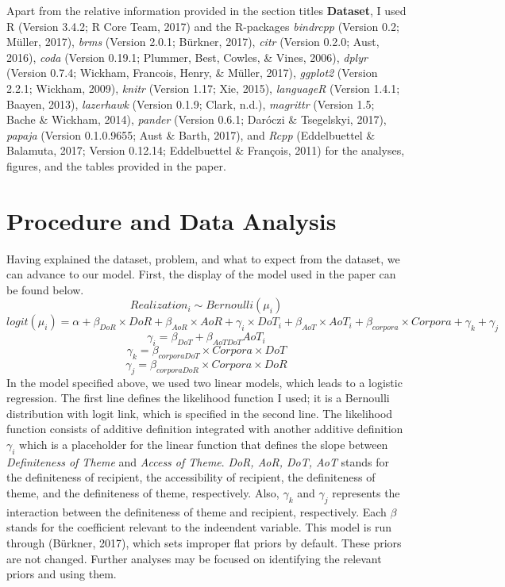 \documentclass[english,floatsintext,man]{apa6}
\theoremstyle{definition}
\theoremstyle{definition}
\theoremstyle{definition}
\theoremstyle{remark}
\begin{document}
Apart from the relative information provided in the section titles
\textbf{Dataset}, I used R (Version 3.4.2; R Core Team, 2017) and the
R-packages \emph{bindrcpp} (Version 0.2; Müller, 2017), \emph{brms}
(Version 2.0.1; Bürkner, 2017), \emph{citr} (Version 0.2.0; Aust, 2016),
\emph{coda} (Version 0.19.1; Plummer, Best, Cowles, \& Vines, 2006),
\emph{dplyr} (Version 0.7.4; Wickham, Francois, Henry, \& Müller, 2017),
\emph{ggplot2} (Version 2.2.1; Wickham, 2009), \emph{knitr} (Version
1.17; Xie, 2015), \emph{languageR} (Version 1.4.1; Baayen, 2013),
\emph{lazerhawk} (Version 0.1.9; Clark, n.d.), \emph{magrittr} (Version
1.5; Bache \& Wickham, 2014), \emph{pander} (Version 0.6.1; Daróczi \&
Tsegelskyi, 2017), \emph{papaja} (Version 0.1.0.9655; Aust \& Barth,
2017), and \emph{Rcpp} (Eddelbuettel \& Balamuta, 2017; Version 0.12.14;
Eddelbuettel \& François, 2011) for the analyses, figures, and the
tables provided in the paper.

\section{Procedure and Data Analysis}\label{procedure-and-data-analysis}

Having explained the dataset, problem, and what to expect from the
dataset, we can advance to our model. First, the display of the model
used in the paper can be found below.
\[Realization_i \sim Bernoulli(\mu_i)\]
\[logit(\mu_i) = \alpha+\beta_{DoR}\times{DoR}+\beta_{AoR}\times{AoR}+\gamma_{i}\times{DoT_i}+\beta_{AoT}\times{AoT_i}+\beta_{corpora}\times{Corpora}+\gamma_k+\gamma_j\]
\[\gamma_i = \beta_{DoT}+\beta_{AoTDoT}AoT_i\]
\[\gamma_k = \beta_{corporaDoT}\times{Corpora\times{DoT}}\]
\[\gamma_j = \beta_{corporaDoR}\times{Corpora\times{DoR}}\] In the model
specified above, we used two linear models, which leads to a logistic
regression. The first line defines the likelihood function I used; it is
a Bernoulli distribution with logit link, which is specified in the
second line. The likelihood function consists of additive definition
integrated with another additive definition \(\gamma_i\) which is a
placeholder for the linear function that defines the slope between
\emph{Definiteness of Theme} and \emph{Access of Theme}. \emph{DoR, AoR,
DoT, AoT} stands for the definiteness of recipient, the accessibility of
recipient, the definiteness of theme, and the definiteness of theme,
respectively. Also, \(\gamma_k\) and \(\gamma_j\) represents the
interaction between the definiteness of theme and recipient,
respectively. Each \(\beta\) stands for the coefficient relevant to the
indeendent variable. This model is run through (Bürkner, 2017), which
sets improper flat priors by default. These priors are not changed.
Further analyses may be focused on identifying the relevant priors and
using them.
\end{document}
